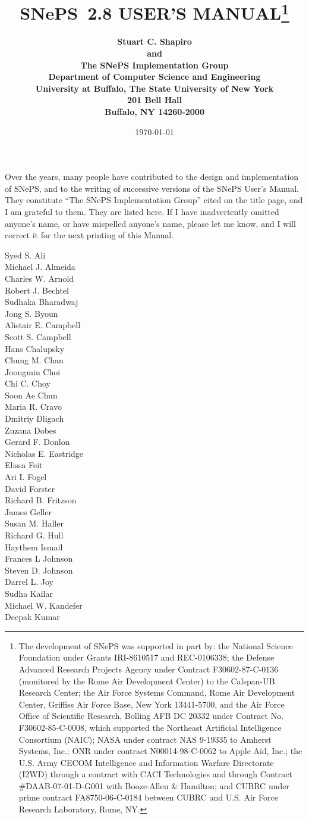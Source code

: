 \documentclass{book}
\title{\bf SNePS~2.8 USER'S MANUAL\thanks{The development of SNePS
    was supported in part by: the National Science Foundation under
    Grants IRI-8610517 and REC-0106338; the Defense Advanced Research
    Projects Agency under Contract F30602-87-C-0136 (monitored by the
    Rome Air Development Center) to the Calspan-UB Research Center;
    the Air Force Systems Command, Rome Air Development Center,
    Griffiss Air Force Base, New York 13441-5700, and the Air Force
    Office of Scientific Research, Bolling AFB DC 20332 under Contract
    No.  F30602-85-C-0008, which supported the Northeast Artificial
    Intelligence Consortium (NAIC); NASA under contract NAS 9-19335 to
    Amherst Systems, Inc.; ONR under contract N00014-98-C-0062 to
    Apple Aid, Inc.; the U.S. Army CECOM Intelligence and Information
    Warfare Directorate (I2WD) through a contract with CACI
    Technologies and through Contract \#DAAB-07-01-D-G001 with
    Booze$\cdot$Allen \& Hamilton; and CUBRC under prime contract
    FA8750-06-C-0184 between CUBRC and U.S. Air Force Research
    Laboratory, Rome, NY.}\\
}
\author{ \bf
Stuart C. Shapiro \\ \bf
and \\ \bf
The SNePS Implementation Group \\[2ex] \bf
Department of Computer Science and Engineering\\ \bf
University at Buffalo, The State University of New York\\ \bf
201 Bell Hall\\ \bf
Buffalo, NY 14260-2000 \\[2ex] \bf
\date{\today}}
\begin{document}
\frontmatter
\maketitle

\pagebreak
Over the years, many people have contributed to the design and
implementation of SNePS, and to the writing of successive versions of
the SNePS User's Manual.  They constitute ``The SNePS Implementation
Group'' cited on the title page, and I am grateful to them.  They are
listed here.  If I have inadvertently omitted anyone's name, or have
mispelled anyone's name, please let me know, and I will correct it for
the next printing of this Manual.
\begin{multicols}{3}
\noindent Syed S. Ali\\
Michael J. Almeida\\
Charles W. Arnold\\
Robert J. Bechtel\\
Sudhaka Bharadwaj\\
Jong S. Byoun\\
Alistair E. Campbell\\
Scott S. Campbell\\
Hans Chalupsky\\
Chung M. Chan\\
Joongmin Choi\\
Chi C. Choy\\
Soon Ae Chun\\
Maria R. Cravo\\
Dmitriy Dligach\\
Zuzana Dobes\\
Gerard F. Donlon\\
Nicholas E. Eastridge\\
Elissa Feit\\
Ari I. Fogel\\
David Forster\\
Richard B. Fritzson\\
James Geller\\
Susan M. Haller\\
Richard G. Hull\\
Haythem Ismail\\
Frances L Johnson\\
Steven D. Johnson\\
Darrel L. Joy\\
Sudha Kailar\\
Michael W. Kandefer\\
Deepak Kumar\\

\end{multicols}
\end{document}
